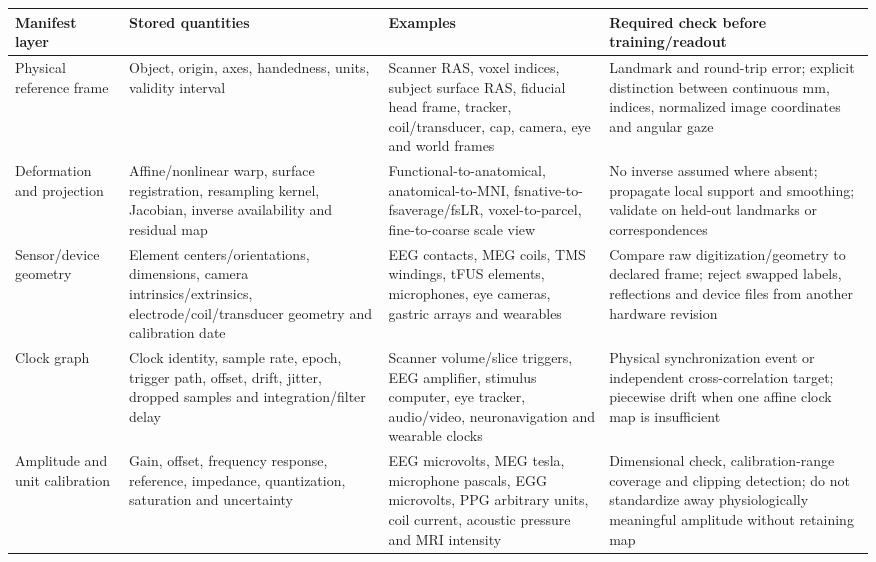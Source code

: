 \begin{table}[!h]
\centering
\footnotesize
\setlength{\tabcolsep}{4pt}
\renewcommand{\arraystretch}{1.10}
\begin{tabularx}{\textwidth}{@{}p{}p{}p{}X@{}}
\toprule
\textbf{Manifest layer} & \textbf{Stored quantities} &
\textbf{Examples} & \textbf{Required check before training/readout}\\
\midrule
Physical reference frame &
Object, origin, axes, handedness, units, validity interval &
Scanner RAS, voxel indices, subject surface RAS, fiducial head frame, tracker,
coil/transducer, cap, camera, eye and world frames &
Landmark and round-trip error; explicit distinction between continuous mm,
indices, normalized image coordinates and angular gaze\\

Deformation and projection &
Affine/nonlinear warp, surface registration, resampling kernel, Jacobian,
inverse availability and residual map &
Functional-to-anatomical, anatomical-to-MNI, fsnative-to-fsaverage/fsLR,
voxel-to-parcel, fine-to-coarse scale view &
No inverse assumed where absent; propagate local support and smoothing;
validate on held-out landmarks or correspondences\\

Sensor/device geometry &
Element centers/orientations, dimensions, camera intrinsics/extrinsics,
electrode/coil/transducer geometry and calibration date &
EEG contacts, MEG coils, TMS windings, tFUS elements, microphones,
eye cameras, gastric arrays and wearables &
Compare raw digitization/geometry to declared frame; reject swapped labels,
reflections and device files from another hardware revision\\

Clock graph &
Clock identity, sample rate, epoch, trigger path, offset, drift, jitter,
dropped samples and integration/filter delay &
Scanner volume/slice triggers, EEG amplifier, stimulus computer, eye tracker,
audio/video, neuronavigation and wearable clocks &
Physical synchronization event or independent cross-correlation target;
piecewise drift when one affine clock map is insufficient\\

Amplitude and unit calibration &
Gain, offset, frequency response, reference, impedance, quantization,
saturation and uncertainty &
EEG microvolts, MEG tesla, microphone pascals, EGG microvolts, PPG arbitrary
units, coil current, acoustic pressure and MRI intensity &
Dimensional check, calibration-range coverage and clipping detection; do not
standardize away physiologically meaningful amplitude without retaining map\\


\end{tabularx}
\end{table}
